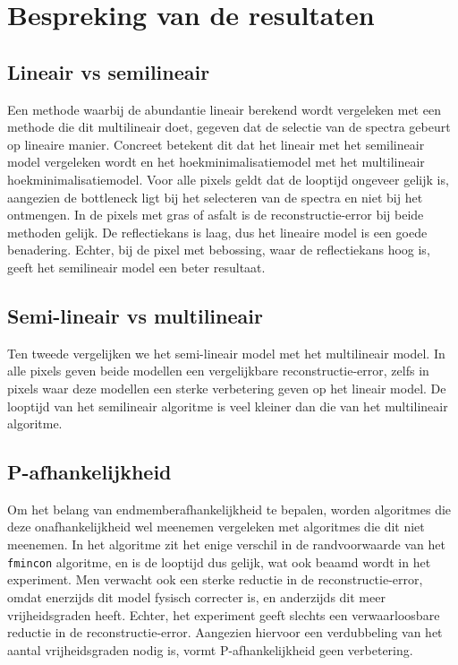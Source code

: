 \documentclass[12pt]{report}
\begin{document}
\section{Bespreking van de resultaten}
\subsection{Lineair vs semilineair}

Een methode waarbij de abundantie lineair berekend wordt vergeleken met een methode die dit multilineair doet, gegeven dat de selectie van de spectra gebeurt op lineaire manier. Concreet betekent dit dat het lineair met het semilineair model vergeleken wordt en het hoekminimalisatiemodel met het multilineair hoekminimalisatiemodel. Voor alle pixels geldt dat de looptijd ongeveer gelijk is, aangezien de bottleneck ligt bij het selecteren van de spectra en niet bij het ontmengen. In de pixels met gras of asfalt is de reconstructie-error bij beide methoden gelijk. De reflectiekans is laag, dus het lineaire model is een goede benadering. Echter, bij de pixel met bebossing, waar de reflectiekans hoog is, geeft het semilineair model een beter resultaat.


\subsection{Semi-lineair vs multilineair}

Ten tweede vergelijken we het semi-lineair model met het multilineair model. In alle pixels geven beide modellen een vergelijkbare reconstructie-error, zelfs in pixels waar deze modellen een sterke verbetering geven op het lineair model. De looptijd van het semilineair algoritme is veel kleiner dan die van het multilineair algoritme. 

\subsection{P-afhankelijkheid}

Om het belang van endmemberafhankelijkheid te bepalen, worden algoritmes die deze onafhankelijkheid wel meenemen vergeleken met algoritmes die dit niet meenemen. In het algoritme zit het enige verschil in de randvoorwaarde van het \texttt{fmincon} algoritme, en is de looptijd dus gelijk, wat ook beaamd wordt in het experiment. Men verwacht ook een sterke reductie in de reconstructie-error, omdat enerzijds dit model fysisch correcter is, en anderzijds dit meer vrijheidsgraden heeft. Echter, het experiment geeft slechts een verwaarloosbare reductie in de reconstructie-error. Aangezien hiervoor een verdubbeling van het aantal vrijheidsgraden nodig is, vormt P-afhankelijkheid geen verbetering.
\end{document}
